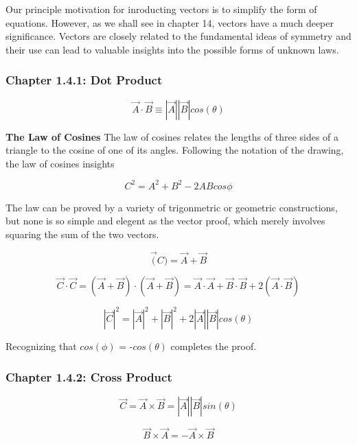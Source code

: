\documentclass[11pt]{article}
\begin{document}
Our principle motivation for inroducting vectors is to simplify the form of equations.
However, as we shall see in chapter 14, vectors have a much deeper significance. Vectors are closely related to the
fundamental ideas of symmetry and their use can lead to valuable insights into the possible forms of unknown laws. 

\begin{center}
    \item \subsubsection*{Chapter 1.4.1: Dot Product} 
\end{center}

\[
    \vec{A} \cdot \vec{B} \equiv |\vec{A}||\vec{B}|cos(\theta)
\]

\textbf{The Law of Cosines}
The law of cosines relates the lengths of three sides of a triangle to the cosine of one of its angles.
Following the notation of the drawing, the law of cosines insights

\[
    C^{2} = A^{2} + B^{2} - 2ABcos{\phi}
\]

The law can be proved by a variety of trigonmetric or geometric constructions, but none is so simple and elegent
as the vector proof, which merely involves squaring the sum of the two vectors.

\[
    \vec(C) = \vec{A} + \vec{B}
\]

\[
    \vec{C} \cdot \vec{C} = (\vec{A} + \vec{B}) \cdot (\vec{A} + \vec{B}) = \vec{A} \cdot \vec{A} + \vec{B} \cdot \vec{B} + 2(\vec{A} \cdot \vec{B}) 
\]

\[
    |\vec{C}|^{2} = |\vec{A}|^{2} + |\vec{B}|^{2} + 2|\vec{A}||\vec{B}|cos(\theta)
\]

Recognizing that $cos(\phi)$ = -$cos(\theta)$ completes the proof.

\newpage

\begin{center}
    \item \subsubsection*{Chapter 1.4.2: Cross Product} 
\end{center}

\[
    \vec{C} = \vec{A} \times \vec{B} = |\vec{A}||\vec{B}|sin(\theta)
\]

\[
    \vec{B} \times \vec{A} = -\vec{A} \times \vec{B}
\]
\end{document}
